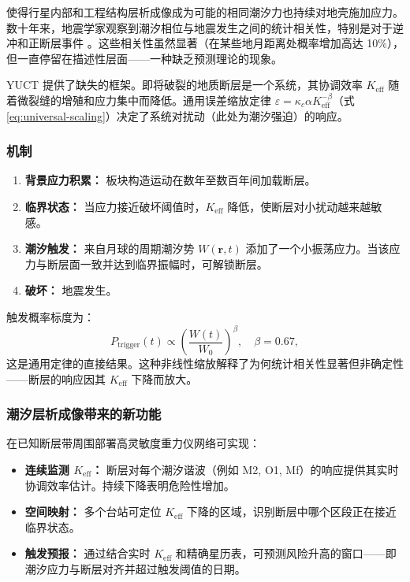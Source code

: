 \documentclass[12pt,a4paper]{article}
\theoremstyle{remark}
\begin{document}
	使得行星内部和工程结构层析成像成为可能的相同潮汐力也持续对地壳施加应力。数十年来，地震学家观察到潮汐相位与地震发生之间的统计相关性，特别是对于逆冲和正断层事件 \cite{Tanaka2012, Tolstoy2013, Sibgatulin2014, RAN2025}。这些相关性虽然显著（在某些地月距离处概率增加高达 10\%），但一直停留在描述性层面——一种缺乏预测理论的现象。
	
	YUCT 提供了缺失的框架。即将破裂的地质断层是一个系统，其协调效率 \(K_{\mathrm{eff}}\) 随着微裂缝的增殖和应力集中而降低。通用误差缩放定律 \(\varepsilon = \kappa_c \alpha K_{\mathrm{eff}}^{-\beta}\)（式 \ref{eq:universal-scaling}）决定了系统对扰动（此处为潮汐强迫）的响应。
	
	\subsubsection{机制}
	
	\begin{enumerate}
		\item \textbf{背景应力积累：} 板块构造运动在数年至数百年间加载断层。
		\item \textbf{临界状态：} 当应力接近破坏阈值时，\(K_{\mathrm{eff}}\) 降低，使断层对小扰动越来越敏感。
		\item \textbf{潮汐触发：} 来自月球的周期潮汐势 \(W(\mathbf{r},t)\) 添加了一个小振荡应力。当该应力与断层面一致并达到临界振幅时，可解锁断层。
		\item \textbf{破坏：} 地震发生。
	\end{enumerate}
	
	触发概率标度为：
	\[
	P_{\text{trigger}}(t) \propto \left( \frac{W(t)}{W_0} \right)^{\beta}, \quad \beta = 0.67,
	\]
	这是通用定律的直接结果。这种非线性缩放解释了为何统计相关性显著但非确定性——断层的响应因其 \(K_{\mathrm{eff}}\) 下降而放大。
	
	\subsubsection{潮汐层析成像带来的新功能}
	
	在已知断层带周围部署高灵敏度重力仪网络可实现：
	
	\begin{itemize}
		\item \textbf{连续监测 \(K_{\mathrm{eff}}\)：} 断层对每个潮汐谐波（例如 M2, O1, Mf）的响应提供其实时协调效率估计。持续下降表明危险性增加。
		\item \textbf{空间映射：} 多个台站可定位 \(K_{\mathrm{eff}}\) 下降的区域，识别断层中哪个区段正在接近临界状态。
		\item \textbf{触发预报：} 通过结合实时 \(K_{\mathrm{eff}}\) 和精确星历表，可预测风险升高的窗口——即潮汐应力与断层对齐并超过触发阈值的日期。
	\end{itemize}
	
\end{document}
